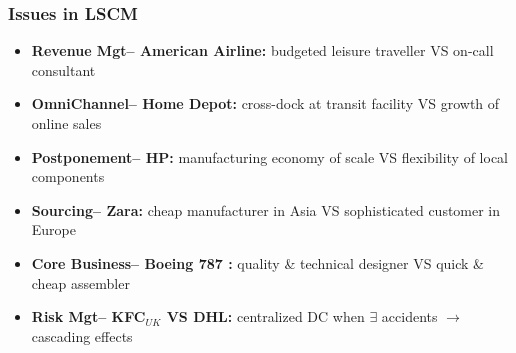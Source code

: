 \documentclass[10pt,handout]{beamer}
\begin{document}
\begin{frame}
  \frametitle{Issues in LSCM}

  \begin{itemize}
    \item \textbf{Revenue Mgt-- American Airline:} budgeted leisure traveller \textsc{VS} on-call consultant
    \item \textbf{OmniChannel-- Home Depot:} cross-dock at transit facility \textsc{VS} growth of online sales
    \item \textbf{Postponement-- HP:} manufacturing economy of scale \textsc{VS} flexibility of local components
    \item \textbf{Sourcing-- Zara:} cheap manufacturer in Asia \textsc{VS} sophisticated customer in Europe
    \item \textbf{Core Business-- Boeing 787 :} quality \& technical designer \textsc{VS} quick \& cheap assembler
    \item \textbf{Risk Mgt-- KFC$_{UK}$ VS DHL:} centralized DC when $\exists$ accidents $\rightarrow$ cascading effects
  \end{itemize}

\end{frame}
\end{document}
